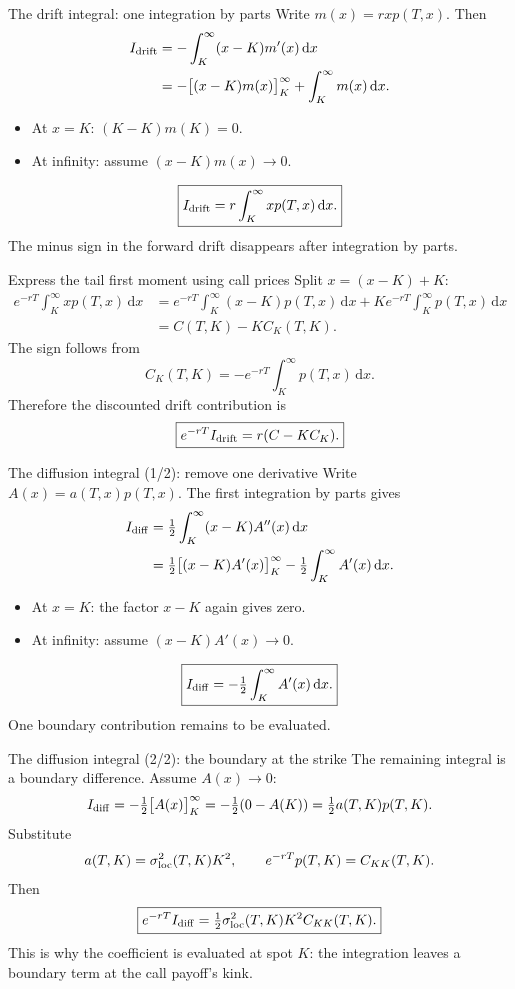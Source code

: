 \documentclass[handout,10pt,t,aspectratio=169]{beamer}
\newcommand{\dd}{\,\mathrm d}
\begin{document}
\begin{frame}{The drift integral: one integration by parts}
\small
Write \(m(x)=rxp(T,x)\). Then
\[
\begin{aligned}
I_{\rm drift}
&=-\int_K^\infty(x-K)m'(x)\dd x\\
&=-\big[(x-K)m(x)\big]_K^\infty
+\int_K^\infty m(x)\dd x.
\end{aligned}
\]
\begin{itemize}
\item At \(x=K\): \((K-K)m(K)=0\).
\item At infinity: assume \((x-K)m(x)\to0\).
\end{itemize}
\[
\boxed{I_{\rm drift}=r\int_K^\infty xp(T,x)\dd x.}
\]
The minus sign in the forward drift disappears after integration by parts.
\end{frame}

\begin{frame}{Express the tail first moment using call prices}
\small
Split \(x=(x-K)+K\):
\[
\begin{aligned}
e^{-rT}\int_K^\infty xp(T,x)\dd x
&=e^{-rT}\int_K^\infty(x-K)p(T,x)\dd x
+Ke^{-rT}\int_K^\infty p(T,x)\dd x\\
&=C(T,K)-K C_K(T,K).
\end{aligned}
\]
The sign follows from
\[
C_K(T,K)=-e^{-rT}\int_K^\infty p(T,x)\dd x.
\]
Therefore the discounted drift contribution is
\[
\boxed{e^{-rT}I_{\rm drift}=r(C-KC_K).}
\]
\end{frame}

\begin{frame}{The diffusion integral (1/2): remove one derivative}
\small
Write \(A(x)=a(T,x)p(T,x)\). The first integration by parts gives
\[
\begin{aligned}
I_{\rm diff}
&=\tfrac12\int_K^\infty(x-K)A''(x)\dd x\\
&=\tfrac12\big[(x-K)A'(x)\big]_K^\infty
-\tfrac12\int_K^\infty A'(x)\dd x.
\end{aligned}
\]
\begin{itemize}
\item At \(x=K\): the factor \(x-K\) again gives zero.
\item At infinity: assume \((x-K)A'(x)\to0\).
\end{itemize}
\[
\boxed{I_{\rm diff}=-\tfrac12\int_K^\infty A'(x)\dd x.}
\]
One boundary contribution remains to be evaluated.
\end{frame}

\begin{frame}{The diffusion integral (2/2): the boundary at the strike}
\small
The remaining integral is a boundary difference. Assume \(A(x)\to0\):
\[
I_{\rm diff}=-\tfrac12\big[A(x)\big]_K^\infty
=-\tfrac12(0-A(K))
=\tfrac12a(T,K)p(T,K).
\]
Substitute
\[
a(T,K)=\sigma_{\rm loc}^2(T,K)K^2,\qquad
e^{-rT}p(T,K)=C_{KK}(T,K).
\]
Then
\[
\boxed{e^{-rT}I_{\rm diff}
=\tfrac12\sigma_{\rm loc}^2(T,K)K^2 C_{KK}(T,K).}
\]
This is why the coefficient is evaluated at spot \(K\): the integration
leaves a boundary term at the call payoff's kink.
\end{frame}
\end{document}
